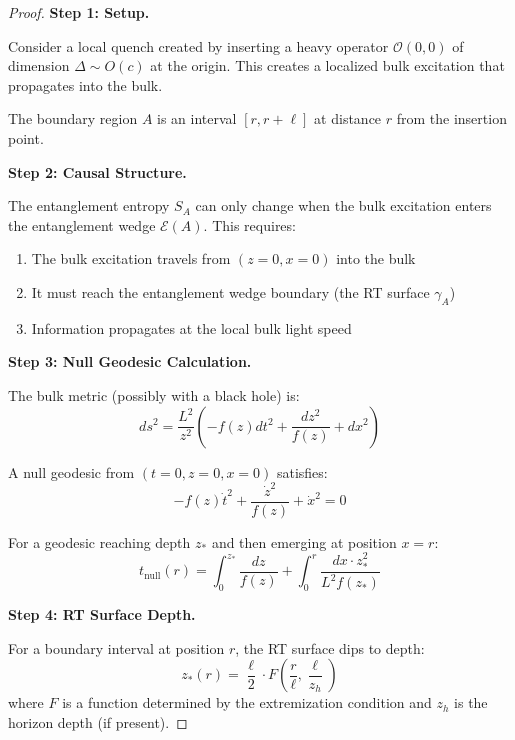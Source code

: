 \documentclass[12pt,a4paper]{article}
\begin{document}
\begin{proof}
\textbf{Step 1: Setup.}

Consider a local quench created by inserting a heavy operator $\mathcal{O}(0,0)$ of dimension $\Delta \sim O(c)$ at the origin. This creates a localized bulk excitation that propagates into the bulk.

The boundary region $A$ is an interval $[r, r+\ell]$ at distance $r$ from the insertion point.

\textbf{Step 2: Causal Structure.}

The entanglement entropy $S_A$ can only change when the bulk excitation enters the entanglement wedge $\mathcal{E}(A)$. This requires:
\begin{enumerate}
    \item The bulk excitation travels from $(z=0, x=0)$ into the bulk
    \item It must reach the entanglement wedge boundary (the RT surface $\gamma_A$)
    \item Information propagates at the local bulk light speed
\end{enumerate}

\textbf{Step 3: Null Geodesic Calculation.}

The bulk metric (possibly with a black hole) is:
\begin{equation}
ds^2 = \frac{L^2}{z^2}\left( -f(z) dt^2 + \frac{dz^2}{f(z)} + dx^2 \right)
\end{equation}

A null geodesic from $(t=0, z=0, x=0)$ satisfies:
\begin{equation}
-f(z)\dot{t}^2 + \frac{\dot{z}^2}{f(z)} + \dot{x}^2 = 0
\end{equation}

For a geodesic reaching depth $z_*$ and then emerging at position $x = r$:
\begin{equation}
t_{\text{null}}(r) = \int_0^{z_*} \frac{dz}{f(z)} + \int_0^r \frac{dx \cdot z_*^2}{L^2 f(z_*)}
\end{equation}

\textbf{Step 4: RT Surface Depth.}

For a boundary interval at position $r$, the RT surface dips to depth:
\begin{equation}
z_*(r) = \frac{\ell}{2} \cdot F\left(\frac{r}{\ell}, \frac{\ell}{z_h}\right)
\end{equation}
where $F$ is a function determined by the extremization condition and $z_h$ is the horizon depth (if present).


\end{proof}
\end{document}
